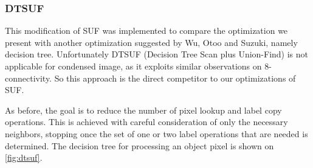 \documentclass[hidelinks]{llncs}
\newcommand{\texten}[1]{#1}
\newcommand{\textru}[1]{}
\begin{document}
\subsubsection{DTSUF}

\texten{
This modification of SUF was implemented to compare the optimization we present
with another optimization suggested by Wu, Otoo and Suzuki\cite{wuotoo}, namely
decision tree. Unfortunately DTSUF (Decision Tree Scan plus Union-Find) is not
applicable for condensed image, as it exploits similar observations on
8-connectivity. So this approach is the direct competitor to our optimizations
of SUF.
}\textru{
Эта модификация SUF была добавлена чтобы сравнить нашу оптимизацию с
одной из оптимизаций, предложенных Wu, Otoo и Suzuki\cite{wuotoo}, а именно с
деревом принятия решения.
К сожалению, DTSUF (Decision Tree Scan with Union-Find) не применим для сжатого
изображения, так как использует свойства 8-связности, которыми наша новая
связность не обладает.
}

\texten{
As before, the goal is to reduce the number of pixel lookup and label copy
operations. This is achieved with careful consideration of only the necessary
neighbors, stopping once the set of one or two label operations that are needed
is determined. The decision tree for processing an object pixel is shown on
\autoref{fig:dtsuf}.
}\textru{
Как и раньше, цель состоит в том, чтобы уменьшить число запросов на содержание
пикселя и копирований меток.
Это достигается аккуратным рассмотрением соседей в оптимальном порядке и
остановкой рассмотрения, как только достаточная для выполнения всех необоходимых
действий информация была получена.
Смотри дерево на \autoref{fig:dtsuf}.
}
\end{document}
